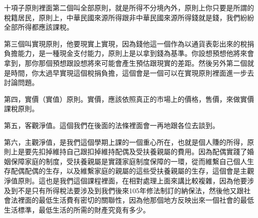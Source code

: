 \documentclass[]{ctexbook}
\begin{document}
十項子原則裡面第二個叫全部原則，就是所得不分境內外，原則上你只要是所謂的稅籍居民，原則上，中華民國來源所得跟非中華民國來源所得錢就是錢，我們紛紛全部所得都應該課稅。

第三個叫實現原則，他要現實上實現，因為錢他這一個作為以通貨表彰出來的稅捐負擔能力，是一種現金支付能力，原則上是以拿到錢為基準。你設想預想他將來會拿到，那你那個預想跟設想將來可能會產生預估跟現實的差距。然後另外第二個就是時間，你太過早實現這個稅捐負擔，這個會是一個可以在實現原則裡面進一步去討論問題。

第四，實價（實值）原則。實價，應該依照真正的市場上的價格，售價，來做實價課稅原則。

第五，客觀淨值。這個我們在後面的法條裡面會一再地跟各位去談到。

第六，主觀淨值，是我們這個學期上課的一個重心所在，也就是個人賺的所得，原則上是要先扣掉維持自己跟扣掉維持配偶及受扶養親屬的費用。因為配偶實踐了婚姻保障家庭的制度，受扶養親屬是實踐家庭制度保障的一環，從而維繫自己個人生存配偶配偶的生存，以及維繫家庭的親屬的這些受扶養親屬的生存，這個會是主觀淨值原則。這也是我們這個課程裡面，在相對處理上面來講比較複雜，因為他要涉及到不是只有所得稅法要涉及到我們後來105年修法制訂的納保法，然後他又跟社會法裡面的最低生活費有密切的關聯性，因為他那個地方反映出來一個社會的最低生活標準，最低生活的所需的財產究竟有多少。
\end{document}
